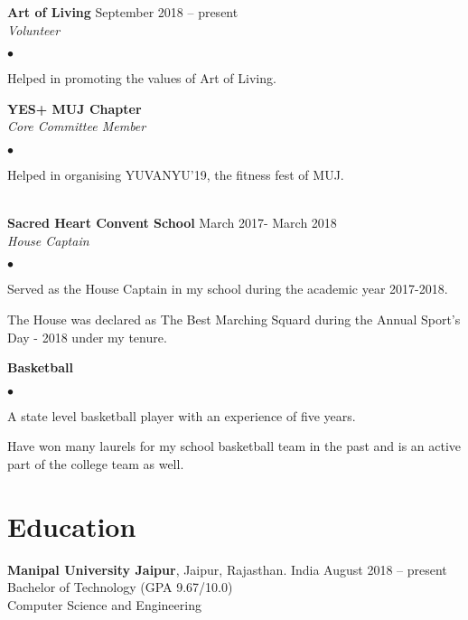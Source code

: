 \documentclass[margin,line]{res}
\newenvironment{list2}{
  \begin{list}{$\bullet$}{%
      \setlength{\itemsep}{0in}
      \setlength{\parsep}{0in} \setlength{\parskip}{0in}
      \setlength{\topsep}{0in} \setlength{\partopsep}{0in}
      \setlength{\leftmargin}{0.2in}}}{\end{list}}
\begin{document}
\begin{resume}
{\bf Art of Living} \hfill{September 2018 -- present} \\
{\em Volunteer}\\
\begin{list2} %
    \item Helped in promoting the values of Art of Living.\\
\end{list2} 

{\bf YES+ MUJ Chapter}\\
{\em Core Committee Member}\\
\begin{list2} %
    \item Helped in organising YUVANYU'19, the fitness fest of MUJ.\\\\
\end{list2} 


{\bf Sacred Heart Convent School} \hfill{March 2017- March 2018}\\
{\em House Captain}\\
\begin{list2} %
    \item Served as the House Captain in my school during the academic year 2017-2018.
    \item The House was declared as The Best Marching Squard during the Annual Sport's Day - 2018 under my tenure. 
\end{list2}

{\bf Basketball}\\
\begin{list2} %
    \item A state level basketball player with an experience of five years.
    \item Have won many laurels for my school basketball team in the past and is an active part of the college team as well.
\end{list2}

\section{\sc Education}
{\bf Manipal University Jaipur}, Jaipur, Rajasthan. India \hfill August 2018 -- present\\
Bachelor of Technology \hfill(GPA 9.67/10.0) \\
Computer Science and Engineering  


\end{resume}
\end{document}
